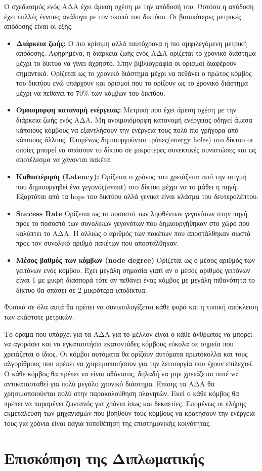 Ο σχεδιασμός ενός ΑΔΑ έχει άμεση σχέση με την απόδοσή του. Ωστόσο η απόδοση έχει πολλές έννοιες ανάλογα με τον σκοπό του δικτύου. Οι βασικότερες μετρικές απόδοσης
είναι οι εξής:
\begin{itemize}
\item \textbf{Διάρκεια ζωής:} Ο πιο κρίσιμη αλλά ταυτόχρονα η πιο αμφιλεγόμενη μετρική απόδοσης. Αφηρημένα, η διάρκεια ζωής ενός ΑΔΑ ορίζεται το χρονικό διάστημα
μέχρι το δίκτυο να γίνει άχρηστο.
Στην βιβλιογραφία οι ορισμοί διαφέρουν σημαντικά.
Ορίζεται ως το χρονικό διάστημα μέχρι να πεθάνει ο πρώτος κόμβος του δικτύου ενώ υπάρχουν και ορισμοί που το ορίζουν ως το χρονικό διάστημα μέχρι να πεθάνει το 70\%
των κόμβων του δικτύου.
\item \textbf{Ομοιομορφη κατανομή ενέργειας:} Μετρική που έχει άμεση σχέση με την διάρκεια ζωής ενός ΑΔΑ.
Μη ανοιμοιόμορφη κατανομή ενέργειας οδηγεί άμεσα κάποιους κόμβους να εξαντλήσουν την ενέργειά τους πολύ πιο γρήγορα από κάποιους άλλους.
Επομένως δημιουργούνται τρύπες(energy holes) στο δίκτυο οι οποίες μπορεί να σπάσουν το δίκτυο σε μικρότερες συνεκτικές συνιστώσες και ως αποτέλεσμα να χάνονται
πακέτα.
\item \textbf{Καθυστέρηση (Latency):} Ορίζεται ο χρόνος που χρειάζεται από την στιγμή που δημιουργηθεί ένα γεγονός(event) στο δίκτυο μέχρι να το μάθει η πηγή.
Εξαρτάται από τα hops του δικτύου αλλά γενικά είναι κλάσμα του δευτερολέπτου.
\item \textbf{Success Rate} Ορίζεται ως το ποσοστό των ληφθέντων γεγονότων στην πηγή προς το ποσοστό των συνολικών γεγονότων που δημιουργήθηκαν στο χώρο που καλύπτει
το ΑΔΑ.
Ή αλλιώς ο αριθμός των πακέτων που αποστάλθηκαν σωστά προς τον συνολικό αριθμό πακέτων που αποστάλθηκαν.
\item \textbf{Μέσος βαθμός των κόμβων (node degree)} Ορίζεται ως ο μέσος αριθμός των γειτόνων ενός κόμβου.
Έχει μεγάλη σημασία γιατί αν ο μέσος αριθμός γειτόνων είναι 1 με μικρή διασπορά τότε αν πεθάνει ένας κόμβος με μεγάλη πιθανότητα το δίκτυο θα σπάσει σε 2 μικρότερα
υποδίκτυα.
\end{itemize}
Φυσικά σε όλα αυτά θα πρέπει να συνυπολογίζεται κάθε φορά και η τυπική απόκλειση των εκάστοτε μετρικών.

Το όραμα που υπάρχει για τα ΑΔΑ για το μέλλον είναι ο κάθε άνθρωπος να μπορεί να αγοράσει και να εγκαταστήσει εκατοντάδες κόμβους εύκολα σε σημεία που χρειάζεται ο
ίδιος.
Οι κόμβοι αυτόματα θα ορίζουν αυτόματα πρωτόκολλα και τους αλγορίθμους που πρέπει να χρησιμοποιήσουν για την λειτουργία που έχουν επιλεχτεί.
Ο κάθε κόμβος θα πρέπει να είναι αθάνατος, δηλαδή να μην χρειάζεται ποτέ να αντικατασταθεί για πολύ μεγάλο χρονικό διάστημα.
Επίσης τα ΑΔΑ θα χρησιμοποιούνται πολύ στην παρακολούθηση πλανητών.
Εκεί ο κάθε κόμβος θα πρέπει να παραμένει ζωντανός για χρόνια ίσως και δεκαετίες.
Επομένως οι πλήρης εκμετάλευση των μηχανισμών που βοηθούν τους κόμβους να κρατήσουν την ενέργειά τους για χρόνια είναι πάγια τοποθέτηση της επιστημονικής κοινότητας.
\section{Επισκόπηση της Διπλωματικής}

\label{ch:wsns}